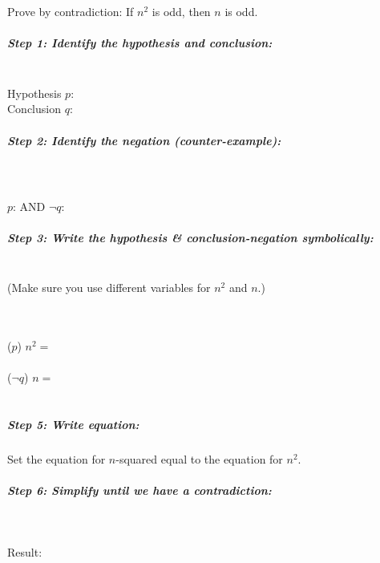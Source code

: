         \newpage
        \begin{questionNOGRADE}{\thequestion}

            Prove by contradiction: If $n^{2}$ is odd, then $n$ is odd.

            \subparagraph{Step 1: Identify the hypothesis and conclusion:}
                ~\\ \tab Hypothesis $p$:    
                ~\\ \tab Conclusion $q$:    
            
            \subparagraph{Step 2: Identify the negation (counter-example):} ~\\~\\
            	\tab[0.5cm]
                $p$:
                 AND \tab[0.5cm]
                $\neg q$:
            
                
            \subparagraph{Step 3: Write the hypothesis \& conclusion-negation symbolically:}
            ~\\
            (Make sure you use different variables for $n^{2}$ and $n$.)
                
                ~\\~\\ \tab ($p$) \tab $n^{2} = $ 
                ~\\~\\ \tab ($\neg q$) \tab $n = $ 
                ~\\~\\ 

            \subparagraph{Step 5: Write equation:}
            
            Set the equation for $n$-squared equal to the equation for $n^2$.
            

            \subparagraph{Step 6: Simplify until we have a contradiction:} ~\\

            Result:
            
        \end{questionNOGRADE}

